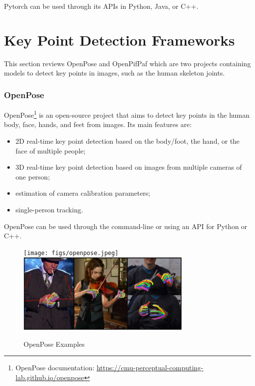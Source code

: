 Pytorch can be used through its APIs in Python, Java, or C++.

\section{Key Point Detection Frameworks}
\label{section:keypointdetection}

This section reviews OpenPose and OpenPifPaf which are two projects containing models to detect key points in images, such as the human skeleton joints.

\subsubsection{OpenPose}

OpenPose\cite{Cao2021,Simon2017,Cao2018,Wei2016}\footnote{OpenPose documentation: \url{https://cmu-perceptual-computing-lab.github.io/openpose}} is an open-source project that aims to detect key points in the human body, face, hands, and feet from images. Its main features are:

\begin{itemize}
    \item 2D real-time key point detection based on the body/foot, the hand, or the face of multiple people;
    \item 3D real-time key point detection based on images from multiple cameras of one person;
    \item estimation of camera calibration parameters;
    \item single-person tracking.
\end{itemize}

OpenPose can be used through the command-line or using an API for Python or C++.

\begin{figure}[h]
\centerline{\texttt{[image: figs/openpose.jpeg]}\includegraphics[height=1.55in]{figs/openpose2.PNG}}
\caption[OpenPose Examples]{OpenPose Examples \cite{Cao2021,Simon2017}}
\label{openpose}
\end{figure}

